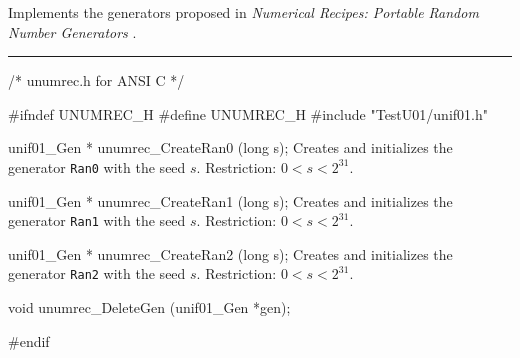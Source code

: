 
Implements the  generators proposed in
{\em Numerical Recipes: Portable Random Number Generators\/}
 \cite{rPRE92a,rPRE92b}.


\bigskip
\hrule
\code
\hide
/* unumrec.h for ANSI C */

#ifndef UNUMREC_H
#define UNUMREC_H
\endhide
#include "TestU01/unif01.h"


unif01_Gen * unumrec_CreateRan0 (long s);
\endcode
  \tab Creates and initializes the generator {\tt Ran0} with the seed $s$. 
%
   Restriction: $0 < s < 2^{31}$.
 \endtab
\code


unif01_Gen * unumrec_CreateRan1 (long s);
\endcode
  \tab Creates and initializes the generator {\tt Ran1} with the seed $s$. 
%
 Restriction: $0 < s < 2^{31}$.
 \endtab
\code


unif01_Gen * unumrec_CreateRan2 (long s);
\endcode 
  \tab  Creates and initializes the generator {\tt Ran2} with the seed $s$. 
%
  Restriction: $0 < s < 2^{31}$.
 \endtab



\code

void unumrec_DeleteGen (unif01_Gen *gen);
\endcode
 \tab \DelGen
 \endtab
\code

\hide
#endif
\endhide
\endcode

